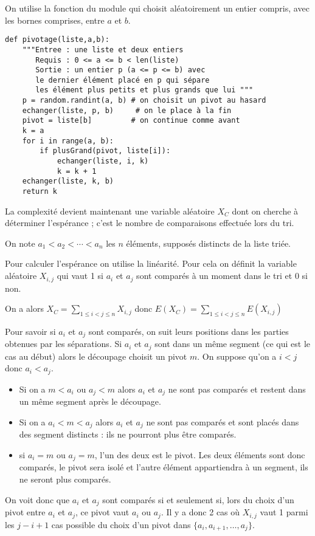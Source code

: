 On utilise la fonction  du module  qui choisit aléatoirement un entier compris, avec les bornes comprises, entre $a$ et $b$.
\begin{lstlisting}[caption = {Découpage aléatoire pour le tri rapide}]
def pivotage(liste,a,b):
    """Entree : une liste et deux entiers
       Requis : 0 <= a <= b < len(liste)
       Sortie : un entier p (a <= p <= b) avec
       le dernier élément placé en p qui sépare
       les élément plus petits et plus grands que lui """
    p = random.randint(a, b) # on choisit un pivot au hasard
    echanger(liste, p, b)     # on le place à la fin
    pivot = liste[b]         # on continue comme avant
    k = a
    for i in range(a, b):
        if plusGrand(pivot, liste[i]):
            echanger(liste, i, k)
            k = k + 1
    echanger(liste, k, b)
    return k
\end{lstlisting}
La complexité devient maintenant une variable aléatoire $X_C$ dont on cherche à déterminer l'espérance ; c'est le nombre de comparaisons effectuée lors du tri.

On note $a_1< a_2 < \cdots < a_n$ les $n$ éléments, supposés distincts de la liste triée.

Pour calculer l'espérance on utilise la linéarité. Pour cela on définit la variable aléatoire $X_{i,j}$ qui vaut 1 si $a_i$ et $a_j$ sont comparés à un moment dans le tri et 0 si non. 

On a alors $\displaystyle X_C = \sum_{1\le i< j \le n} X_{i, j}$ donc $\displaystyle E(X_C) = \sum_{1\le i< j \le n} E(X_{i, j})$

Pour savoir si $a_i$ et $a_j$ sont comparés, on suit leurs positions dans les parties obtenues par les séparations. Si $a_i$ et $a_j$ sont dans un même segment (ce qui est le cas au début) alors le découpage choisit un pivot $m$. On suppose qu'on a $i< j$ donc $a_i < a_j$.

\begin{itemize}
    \item Si on a $m< a_i$ ou $a_j < m$ alors $a_i$ et $a_j$ ne sont pas comparés et restent dans un même segment après le découpage.
    \item Si on a $a_i < m< a_j$ alors $a_i$ et $a_j$ ne sont pas comparés et sont placés dans des segment distincts : ils ne pourront plus être comparés.
    \item si $a_i=m$ ou $a_j=m$, l'un des deux est le pivot. Les deux éléments sont donc comparés, le pivot sera isolé et l'autre élément appartiendra à un segment, ils ne seront plus comparés.
\end{itemize}
On voit donc que $a_i$ et $a_j$ sont comparés si et seulement si, lors du choix d'un pivot entre $a_i$ et $a_j$, ce pivot vaut $a_i$ ou $a_j$. Il y a donc 2 cas où $X_{i,j}$ vaut 1 parmi les $j-i+1$ cas possible du choix d'un pivot dans $\{a_i,a_{i+1}, \ldots, a_j\}$.

